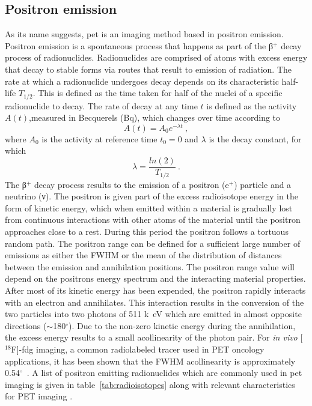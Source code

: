 \subsection{Positron emission}
As its name suggests, \gls{pet} is an imaging method based in positron emission. Positron emission is a spontaneous process that happens as part of the β$^{+}$ decay process of radionuclides. 
Radionuclides are comprised of atoms with excess energy that decay to stable forms via routes that result to emission of radiation.
The rate at which a radionuclide undergoes decay depends on its characteristic half-life $T_{1/2}$. This is defined as the time taken for half of the nuclei of a specific radionuclide to decay. The rate of decay at any time $t$ is defined as the activity $A(t)$,measured in Becquerels (Bq), which changes over time according to
\begin{equation} \label{Decay}
A(t) = A_0 e^{-\lambda t} \ ,
\end{equation}
where $A_0$ is the activity at reference time $t_0=0$ and $\lambda$ is the decay constant, for which 
\begin{equation} \label{Decayconstant}
\lambda = \frac{ln(2)}{T_{1/2}} \ .
\end{equation}
%
The β$^{+}$ decay process results to the emission of a positron (e$^{+}$) particle and a neutrino (ν). The positron is given part of the excess radioisotope energy in the form of kinetic energy, which when emitted within a material is gradually lost from continuous interactions with other atoms of the material until the positron approaches close to a rest. During this period the positron follows a tortuous random path. The positron range can be defined for a sufficient large number of emissions as either the FWHM or the mean of the distribution of distances between the emission and annihilation positions. The positron range value will depend on the positrons energy spectrum and the interacting material properties. After most of its kinetic energy has been expended, the positron rapidly interacts with an electron and annihilates. This interaction results in the conversion of the two particles into two photons of 511 \si{k\electronvolt} which are emitted in almost opposite directions ($\sim$180$^{\circ}$). Due to the non-zero kinetic energy during the annihilation, the excess energy results to a small acollinearity of the photon pair. For \textit{in vivo} [$^{18}$F]-\gls{fdg} imaging, a common radiolabeled tracer used in PET oncology applications, it has been shown that the FWHM acollinearity is approximately 0.54$^{\circ}$~\cite{Shibuya2007}.
%
A list of positron emitting radionuclides which are commonly used in \gls{pet} imaging is given in table~\ref{tab:radioisotopes} along with relevant characteristics for PET imaging \cite{Conti2016}.

